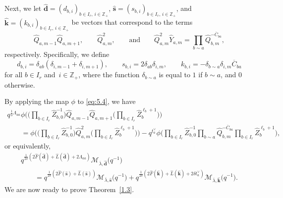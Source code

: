 \documentclass[pdftex]{sigma}
\numberwithin{equation}{section}
\begin{document}
Next, we let $\widehat{\mathbf{d}}=(d_{b,i})_{b\in I_r,\,i\in\mathbb{Z}_+}$, $\widehat{\mathbf{s}}=(s_{b,i})_{b\in I_r,\, i\in\mathbb{Z}_+}$, and $\widehat{\mathbf{k}}=(k_{b,i})_{b\in I_r,\,i\in\mathbb{Z}_+}$ be vectors that correspond to the terms
\[
\widehat{Q}_{a,m-1}\widehat{Q}_{a,m+1} , \qquad \widehat{Q}_{a,m}^2, \qquad \text{and}\qquad
\widehat{Q}_{a,m}^2\widehat{Y}_{a,m}=\prod_{b\sim a}\widehat{Q}_{b,m}^{-\overline{C}_{ba}},
\]
 respectively. Specifically, we define
\[
d_{b,i}
=\delta_{ab}(\delta_{i,m-1}+\delta_{i,m+1}), \qquad
s_{b,i}
=2\delta_{ab}\delta_{i,m} , \qquad
k_{b,i}
=-\delta_{b\sim a}\delta_{i,m}\overline{C}_{ba}
\]
for all $b\in I_r$ and~${i\in\mathbb{Z}_+}$, where the function $\delta_{b\sim a}$ is equal to $1$ if $b\sim a$, and $0$ otherwise.

By applying the map $\phi$ to \eqref{eq:5.4}, we have
\begin{gather*}
q^{\frac{1}{\delta}\Lambda_{aa}}\phi\biggl(\biggl(\prod_{b\in I_r}\widehat{Z}_{b,0}^{-1}\biggr)\widehat{Q}_{a,m-1}\widehat{Q}_{a,m+1}\biggl(\prod_{b\in I_r}\widehat{Z}_b^{\ell_b+1}\biggr)\biggr)\\
\qquad=\phi\biggl(\biggl(\prod_{b\in I_r}\widehat{Z}_{b,0}^{-1}\biggr)\widehat{Q}_{a,m}^2\biggl(\prod_{b\in I_r}\widehat{Z}_b^{\ell_b+1}\biggr)\biggr)
-q^{t_a^{\vee}}\phi\biggl(\prod_{b\in I_r}\widehat{Z}_{b,0}^{-1}\prod_{b\sim a}\widehat{Q}_{b,m}^{-\overline{C}_{ba}}\prod_{b\in I_r}\widehat{Z}_b^{\ell_b+1}\biggr),
\end{gather*}
or equivalently,
\begin{gather}
q^{\frac{1}{2\delta}(2\widehat{F}(\widehat{\mathbf{d}})+\widehat{L}(\widehat{\mathbf{d}})+2\Lambda_{aa})}
\mathcal{M}_{\overline{\lambda},\widehat{\mathbf{d}}}\bigl(q^{-1}\bigr)\nonumber\\
\qquad
=q^{\frac{1}{2\delta}(2\widehat{F}(\widehat{\mathbf{s}})+\widehat{L}(\widehat{\mathbf{s}}))}\mathcal{M}_{\overline{\lambda},\widehat{\mathbf{s}}}\bigl(q^{-1}\bigr)
+q^{\frac{1}{2\delta}(2\widehat{F}(\widehat{\mathbf{k}})+\widehat{L}(\widehat{\mathbf{k}})+2\delta t_a^{\vee})}\mathcal{M}_{\overline{\lambda},\widehat{\mathbf{k}}}\bigl(q^{-1}\bigr).\label{eq:5.8}
\end{gather}
We are now ready to prove Theorem~\ref{1.3}.
\end{document}
